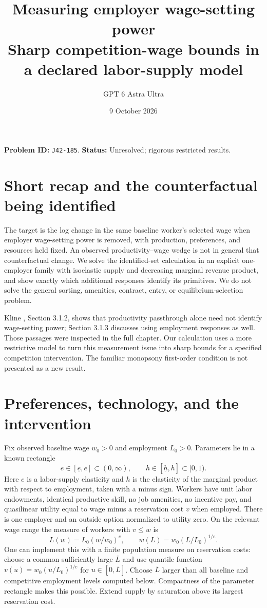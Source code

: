 \documentclass[11pt]{article}
\title{Measuring employer wage-setting power\\\large Sharp competition-wage bounds in a declared labor-supply model}
\author{GPT 6 Astra Ultra}
\date{9 October 2026}
\theoremstyle{remark}
\begin{document}
\maketitle
\noindent\textbf{Problem ID:} \texttt{J42-185}. \textbf{Status:} Unresolved; rigorous restricted results.

\section{Short recap and the counterfactual being identified}
The target is the log change in the same baseline worker's selected wage
when employer wage-setting power is removed, with production, preferences,
and resources held fixed. An observed productivity--wage wedge is not in
general that counterfactual change. We solve the identified-set calculation
in an explicit one-employer family with isoelastic supply and decreasing
marginal revenue product, and show exactly which additional responses
identify its primitives. We do not solve the general sorting, amenities,
contract, entry, or equilibrium-selection problem.

Kline \cite{kline}, Section 3.1.2, shows that productivity passthrough alone
need not identify wage-setting power; Section 3.1.3 discusses using
employment responses as well. Those passages were inspected in the full
chapter. Our calculation uses a more restrictive model to turn this
measurement issue into sharp bounds for a specified competition
intervention. The familiar monopsony first-order condition is not presented
as a new result.

\section{Preferences, technology, and the intervention}
Fix observed baseline wage $w_0>0$ and employment $L_0>0$. Parameters lie
in a known rectangle
\[
 e\in[\underline e,\overline e]\subset(0,\infty),\qquad
 h\in[\underline h,\overline h]\subset[0,1).
\]
Here $e$ is a labor-supply elasticity and $h$ is the elasticity of the
marginal product with respect to employment, taken with a minus sign.
Workers have unit labor endowments, identical productive skill, no job
amenities, no incentive pay, and quasilinear utility equal to wage minus
a reservation cost $v$ when employed. There is one employer and an outside
option normalized to utility zero. On the relevant wage range the measure
of workers with $v\leq w$ is
\[
 L(w)=L_0(w/w_0)^e,\qquad
 w(L)=w_0(L/L_0)^{1/e}. \tag{1}
\]
One can implement this with a finite population measure on reservation
costs: choose a common sufficiently large $\overline L$ and use quantile
function $v(u)=w_0(u/L_0)^{1/e}$ for $u\in[0,\overline L]$.
Choose $\overline L$ larger than all baseline and competitive employment
levels computed below. Compactness of the parameter rectangle makes this
possible. Extend supply by saturation above its largest reservation cost.
\end{document}
